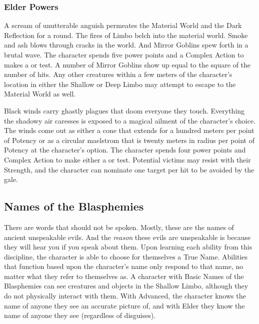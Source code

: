 \subsubsection{Elder Powers}

 A scream of unutterable anguish permeates the Material World and the Dark Reflection for a round. The fires of Limbo belch into the material world. Smoke and ash blows through cracks in the world. And Mirror Goblins spew forth in a brutal wave. The character spends five power points and a Complex Action to makes a  or  test. A number of Mirror Goblins show up equal to the square of the number of hits. Any other creatures within a few meters of the character's location in either the Shallow or Deep Limbo may attempt to escape to the Material World as well.

 Black winds carry ghastly plagues that doom everyone they touch. Everything the shadowy air caresses is exposed to a magical ailment of the character's choice. The winds come out as either a cone that extends for a hundred meters per point of Potency or as a circular maelstrom that is twenty meters in radius per point of Potency at the character's option. The character spends four power points and Complex Action to make either a  or  test. Potential victims may resist with their Strength, and the character can nominate one target per hit to be avoided by the gale.


\subsection{Names of the Blasphemies}

There are words that should not be spoken. Mostly, these are the names of ancient unspeakable evils. And the \textit{reason} these evils are unspeakable is because they will hear you if you speak about them. Upon learning each ability from this discipline, the character is able to choose for themselves a True Name. Abilities that function based upon the character's name only respond to that name, no matter what they refer to themselves as. A character with Basic Names of the Blasphemies can see creatures and objects in the Shallow Limbo, although they do not physically interact with them. With Advanced, the character knows the name of anyone they see an accurate picture of, and with Elder they know the name of anyone they see (regardless of disguises).


